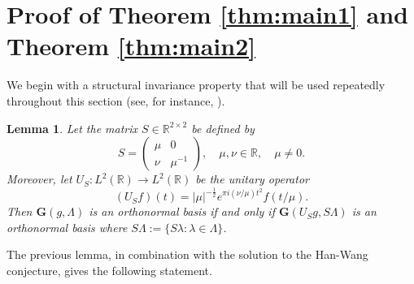 \documentclass[reqno,a4paper,12pt]{amsart}
\numberwithin{equation}{section}
\newtheorem{lemma}[definition]{Lemma}
\def\R{{\mathbb R}}
\newcommand{\lt}{{L^2(\R)}}
\newcommand\1{\mathds{1}}
\begin{document}
\section{Proof of Theorem \ref{thm:main1} and Theorem \ref{thm:main2}}

We begin with a structural invariance property that will be used repeatedly throughout this section (see, for instance, \cite{folland}).

\begin{lemma}\label{lma:chirp_invariance}
    Let the matrix $S \in \R^{2 \times 2}$ be defined by
    $$
    S = \begin{pmatrix}
        \mu & 0 \\ \nu & \mu^{-1}
    \end{pmatrix}, \quad \mu,\nu \in \R, \quad \mu \neq 0.
    $$
    Moreover, let $U_S : \lt \to \lt$ be the unitary operator
    $$
    (U_Sf)(t) = |\mu|^{-\frac12} e^{\pi i (\nu/\mu) t^2} f(t/\mu).
    $$
    Then $\mathbf{G}(g,\Lambda)$ is an orthonormal basis if and only if $\mathbf{G}(U_Sg,S\Lambda)$ is an orthonormal basis where $S\Lambda := \{ S\lambda : \lambda \in \Lambda \}$.
\end{lemma}

The previous lemma, in combination with the solution to the Han-Wang conjecture, gives the following statement.
\end{document}
